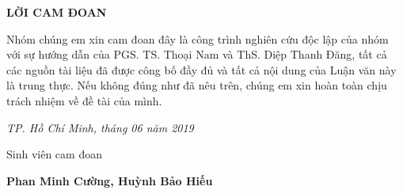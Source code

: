 \centerline{\bf \large\MakeUppercase{Lời cam đoan}}

\vspace{20pt}

Nhóm chúng em xin cam đoan đây là công trình nghiên cứu độc lập của nhóm với sự hướng dẫn của PGS. TS. Thoại Nam và ThS. Diệp Thanh Đăng, tất cả các nguồn tài liệu đã được công bố đầy đủ và tất cả nội dung của Luận văn này là trung thực. Nếu không đúng như đã nêu trên, chúng em xin hoàn toàn chịu trách nhiệm về đề tài của mình.

\begin{flushright}
	{\it TP. Hồ Chí Minh, tháng 06 năm 2019}
	
	Sinh viên cam đoan \hskip 2cm\quad
	
	\vskip 1cm
	{\bf Phan Minh Cường, Huỳnh Bảo Hiếu} \quad\ 
\end{flushright}
